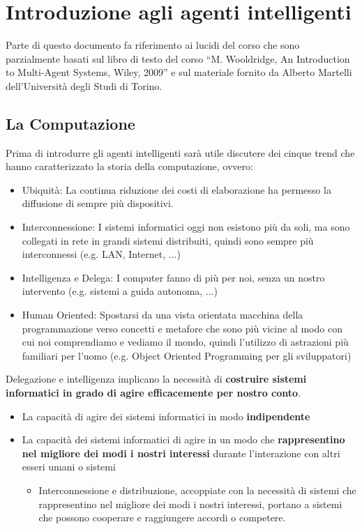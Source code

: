 \section{Introduzione agli agenti intelligenti}
Parte di questo documento fa riferimento ai lucidi del corso che sono parzialmente basati sul libro di testo del corso “M. Wooldridge, An Introduction to Multi-Agent Systems, Wiley, 2009” e sul materiale fornito da Alberto Martelli dell’Università degli Studi di Torino.

\subsection{La Computazione}
Prima di introdurre gli agenti intelligenti sarà utile discutere dei cinque trend che hanno caratterizzato la storia della computazione, ovvero:
\begin{itemize}
    \item Ubiquità: La continua riduzione dei costi di elaborazione ha permesso la diffusione di sempre più dispositivi.
    \item Interconnessione: I sistemi informatici oggi non esistono più da soli, ma sono collegati in rete in grandi sistemi distribuiti, quindi sono sempre più interconnessi (e.g. LAN, Internet, ...)
    \item Intelligenza e Delega: I computer fanno di più per noi, senza un nostro intervento (e.g. sistemi a guida autonoma, ...)
    \item Human Oriented: Spostarsi da una vista orientata macchina della programmazione verso concetti e metafore che sono più vicine al modo con cui noi comprendiamo e vediamo il mondo, quindi l'utilizzo di astrazioni più familiari per l'uomo (e.g. Object Oriented Programming per gli sviluppatori)
\end{itemize}

Delegazione e intelligenza implicano la necessità di \textbf{costruire sistemi informatici in grado di
agire efficacemente per nostro conto}.
\begin{itemize}
    \item La capacità di agire dei sistemi informatici in modo \textbf{indipendente}
    \item La capacità dei sistemi informatici di agire in un modo che \textbf{rappresentino nel migliore dei modi i nostri interessi} durante l’interazione con altri esseri umani o sistemi
        \begin{itemize}
            \item Interconnessione e distribuzione, accoppiate con la necessità di sistemi che rappresentino nel migliore dei modi i nostri interessi, portano a sistemi che possono
cooperare e raggiungere accordi o competere.
        \end{itemize}
\end{itemize}

